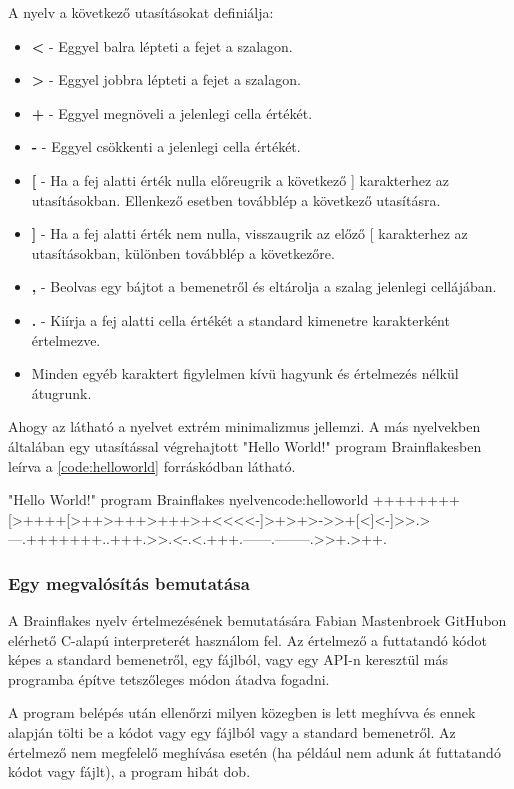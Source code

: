 A nyelv a következő utasításokat definiálja:

\begin{itemize}
    \item \textbf{<} - Eggyel balra lépteti a fejet a szalagon.
    \item \textbf{>} - Eggyel jobbra lépteti a fejet a szalagon.
    \item \textbf{+} - Eggyel megnöveli a jelenlegi cella értékét.
    \item \textbf{-} - Eggyel csökkenti a jelenlegi cella értékét.
    \item \textbf{[} - Ha a fej alatti érték nulla előreugrik a következő ] karakterhez az utasításokban. Ellenkező esetben továbblép a következő utasításra. 
    \item \textbf{]} - Ha a fej alatti érték nem nulla, visszaugrik az előző [ karakterhez az utasításokban, különben továbblép a következőre.
    \item \textbf{,} - Beolvas egy bájtot a bemenetről és eltárolja a szalag jelenlegi cellájában.
    \item \textbf{.} - Kiírja a fej alatti cella értékét a standard kimenetre karakterként értelmezve.
    \item Minden egyéb karaktert figylelmen kívü hagyunk és értelmezés nélkül átugrunk.
\end{itemize}

Ahogy az látható a nyelvet extrém minimalizmus jellemzi. A más nyelvekben általában egy utasítással végrehajtott "Hello World!" program Brainflakesben leírva a \ref{code:helloworld} forráskódban látható.

\begin{code}{"Hello World!" program Brainflakes nyelven}{code:helloworld}
++++++++[>++++[>++>+++>+++>+<<<<-]>+>+>->>+[<]<-]>>.>---.+++++++..+++.>>.<-.<.+++.------.--------.>>+.>++.
\end{code}

\subsubsection{Egy megvalósítás bemutatása}

A Brainflakes nyelv értelmezésének bemutatására Fabian Mastenbroek GitHubon elérhető C-alapú interpreterét\cite{bfimpl} használom fel. Az értelmező a futtatandó kódot képes a standard bemenetről, egy fájlból, vagy egy API-n keresztül más programba építve tetszőleges módon átadva fogadni.

A program belépés után ellenőrzi milyen közegben is lett meghívva és ennek alapján tölti be a kódot vagy egy fájlból vagy a standard bemenetről. Az értelmező nem megfelelő meghívása esetén (ha például nem adunk át futtatandó kódot vagy fájlt), a program hibát dob. 

